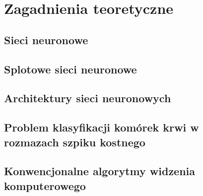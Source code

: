 \chapter{Zagadnienia teoretyczne}

\section{Sieci neuronowe}

\section{Splotowe sieci neuronowe}

\section{Architektury sieci neuronowych}

\section{Problem klasyfikacji komórek krwi w rozmazach szpiku kostnego}

\section{Konwencjonalne algorytmy widzenia komputerowego}